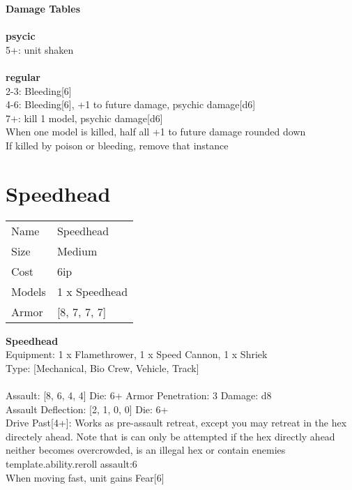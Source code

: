 {\bf Damage Tables} \\
\ \\ {\bf psycic } \\
5+: unit shaken \\
\ \\ {\bf regular } \\
2-3: Bleeding[6] \\
4-6: Bleeding[6], +1 to future damage, psychic damage[d6] \\
7+: kill 1 model, psychic damage[d6] \\
When one model is killed, half all +1 to future damage rounded down \\
If killed by poison or bleeding, remove that instance \\










\pagebreak\pagebreak

\section{ Speedhead }

\begin{tabular}{ll}
  Name & Speedhead \\
  Size & Medium\\
  Cost & 6ip\\
  Models & 1 x Speedhead\\
  Armor & [8, 7, 7, 7]\\
\end{tabular}

\noindent 

{\bf Speedhead } \\
Equipment: 1 x Flamethrower, 1 x Speed Cannon, 1 x Shriek \\
Type: [Mechanical, Bio Crew, Vehicle, Track] \\
\ \\
Assault: [8, 6, 4, 4] Die: 6+ Armor Penetration: 3 Damage: d8 \\
Assault Deflection: [2, 1, 0, 0] Die: 6+\\
\indent Drive Past[4+]: Works as pre-assault retreat, except you may retreat in the hex directely ahead. Note that is can only be attempted if the hex directly ahead neither becomes overcrowded, is an illegal hex or contain enemies\\ 
{template.ability.reroll assault:6}\\ 
When moving fast, unit gains Fear[6]\\ 
 
